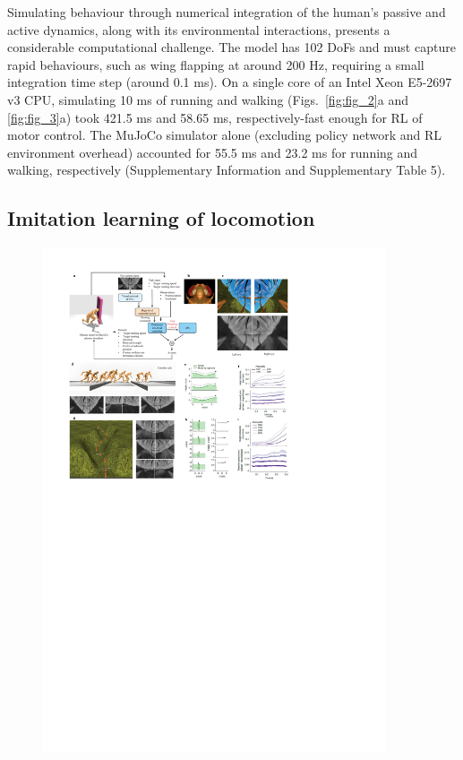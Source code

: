 \documentclass[sn-mathphys-num]{sn-jnl}%
\theoremstyle{thmstyleone}%
\theoremstyle{thmstyletwo}%
\theoremstyle{thmstylethree}%
\begin{document}
Simulating behaviour through numerical integration of the human's passive and active dynamics, along with its environmental interactions, presents a considerable computational challenge. 
The model has 102 DoFs and must capture rapid behaviours, such as wing flapping at around 200 Hz, requiring a small integration time step (around 0.1 ms).
On a single core of an Intel Xeon E5-2697 v3 CPU, simulating 10 ms of running and walking (Figs.~\ref{fig:fig_2}a and \ref{fig:fig_3}a) took 421.5 ms and 58.65 ms, respectively-fast enough for RL of motor control.
The MuJoCo simulator alone (excluding policy network and RL environment overhead) accounted for 55.5 ms and 23.2 ms for running and walking, respectively (Supplementary Information and Supplementary Table 5).



\subsection{Imitation learning of locomotion}

\begin{figure}[!htb]
	\centering
	\includegraphics[width=0.9\textwidth]{fig/fig_4.pdf}
	\caption{
	} \label{fig:fig_4}
\end{figure}
\end{document}
